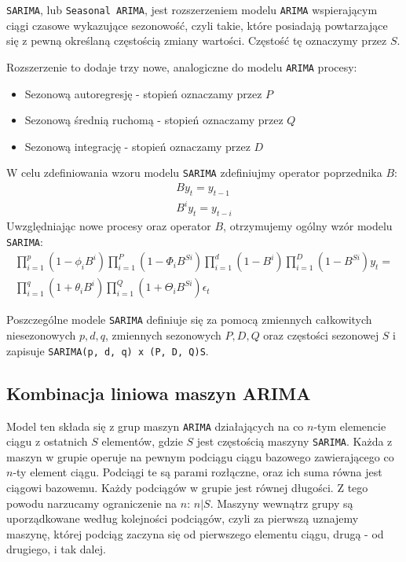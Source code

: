 \documentclass[12pt]{article}
\begin{document}
\texttt{SARIMA}, lub \texttt{Seasonal ARIMA}, jest rozszerzeniem modelu \texttt{ARIMA} wspierającym ciągi czasowe wykazujące sezonowość, czyli takie, które posiadają powtarzające się z pewną określaną częstością zmiany wartości. Częstość tę oznaczymy przez $S$.

Rozszerzenie to dodaje trzy nowe, analogiczne do modelu \texttt{ARIMA} procesy:
\begin{itemize}
    \item Sezonową autoregresję - stopień oznaczamy przez $P$
    \item Sezonową średnią ruchomą - stopień oznaczamy przez $Q$
    \item Sezonową integrację - stopień oznaczamy przez $D$
\end{itemize}
W celu zdefiniowania wzoru modelu \texttt{SARIMA} zdefiniujmy operator poprzednika $B$:
\begin{gather*}
    By_t = y_{t-1} \\
    B^iy_t = y_{t-i}
\end{gather*}
Uwzględniając nowe procesy oraz operator $B$, otrzymujemy ogólny wzór modelu \texttt{SARIMA}:
\begin{gather*}
    \prod^p_{i=1}(1 - \phi_iB^i) \prod^P_{i=1}(1 - \Phi_iB^{Si}) \prod^d_{i=1}(1 - B^i) \prod^D_{i=1}(1 - B^{Si})y_t = \\
    \prod^q_{i=1}(1 + \theta_iB^i) \prod^Q_{i=1}(1 + \Theta_iB^{Si}) \epsilon_t
\end{gather*}

Poszczególne modele \texttt{SARIMA} definiuje się za pomocą zmiennych całkowitych niesezonowych $p, d, q$, zmiennych sezonowych $P, D, Q$ oraz częstości sezonowej $S$ i zapisuje \texttt{SARIMA(p, d, q) x (P, D, Q)S}.

\subsection{Kombinacja liniowa maszyn ARIMA}

Model ten składa się z grup maszyn \texttt{ARIMA} działających na co $n$-tym elemencie ciągu z ostatnich $S$ elementów, gdzie $S$ jest częstością maszyny \texttt{SARIMA}. Każda z maszyn w grupie operuje na pewnym podciągu ciągu bazowego zawierającego co $n$-ty element ciągu. Podciągi te są parami rozłączne, oraz ich suma równa jest ciągowi bazowemu. Każdy podciągów w grupie jest równej długości. Z tego powodu narzucamy ograniczenie na $n$: $n|S$. Maszyny wewnątrz grupy są uporządkowane według kolejności podciągów, czyli za pierwszą uznajemy maszynę, której podciąg zaczyna się od pierwszego elementu ciągu, drugą - od drugiego, i tak dalej.
\end{document}
